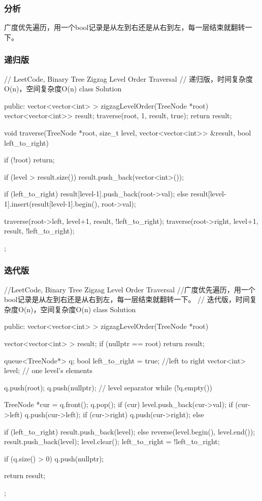 \subsubsection{分析}
广度优先遍历，用一个bool记录是从左到右还是从右到左，每一层结束就翻转一下。


\subsubsection{递归版}
\begin{Code}
	// LeetCode, Binary Tree Zigzag Level Order Traversal
	// 递归版，时间复杂度O(n)，空间复杂度O(n)
	class Solution {
		public:
		vector<vector<int> > zigzagLevelOrder(TreeNode *root) {
			vector<vector<int>> result;
			traverse(root, 1, result, true);
			return result;
		}
		
		void traverse(TreeNode *root, size_t level, vector<vector<int>> &result,
		bool left_to_right) {
			if (!root) return;
			
			if (level > result.size())
			result.push_back(vector<int>());
			
			if (left_to_right)
			result[level-1].push_back(root->val);
			else
			result[level-1].insert(result[level-1].begin(), root->val);
			
			traverse(root->left, level+1, result, !left_to_right);
			traverse(root->right, level+1, result, !left_to_right);
		}
	};
\end{Code}

\subsubsection{迭代版}
\begin{Code}
	//LeetCode, Binary Tree Zigzag Level Order Traversal
	//广度优先遍历，用一个bool记录是从左到右还是从右到左，每一层结束就翻转一下。
	// 迭代版，时间复杂度O(n)，空间复杂度O(n)
	class Solution {
		public:
		vector<vector<int> > zigzagLevelOrder(TreeNode *root) {
			vector<vector<int> > result;
			if (nullptr == root) return result;
			
			queue<TreeNode*> q;
			bool left_to_right = true;  //left to right
			vector<int> level;  // one level's elements
			
			q.push(root);
			q.push(nullptr);  // level separator
			while (!q.empty()) {
				TreeNode *cur = q.front();
				q.pop();
				if (cur) {
					level.push_back(cur->val);
					if (cur->left) q.push(cur->left);
					if (cur->right) q.push(cur->right);
				} else {
				if (left_to_right) {
					result.push_back(level);
				} else {
				reverse(level.begin(), level.end());
				result.push_back(level);
			}
			level.clear();
			left_to_right = !left_to_right;
			
			if (q.size() > 0) q.push(nullptr);
		}
	}
	
	return result;
}
};
\end{Code}


